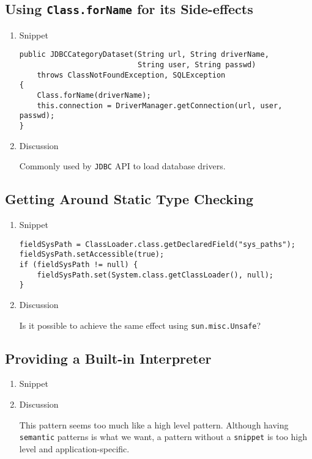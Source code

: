 \documentclass{usiinfdocprop}
\begin{document}
\subsection{Using \texttt{Class.forName} for its Side-effects}
\label{sec:orgf4a1f63}
\begin{enumerate}
\item Snippet
\label{sec:org295b080}

\lstset{language=java,label= ,caption= ,captionpos=b,numbers=none}
\begin{lstlisting}
public JDBCCategoryDataset(String url, String driverName,
                           String user, String passwd)
    throws ClassNotFoundException, SQLException
{
    Class.forName(driverName);
    this.connection = DriverManager.getConnection(url, user, passwd);
}
\end{lstlisting}

\item Discussion
\label{sec:orgcc814ae}

Commonly used by \texttt{JDBC} API to load database drivers.
\end{enumerate}

\subsection{Getting Around Static Type Checking}
\label{sec:orgf154835}
\begin{enumerate}
\item Snippet
\label{sec:org834a23c}

\lstset{language=java,label= ,caption= ,captionpos=b,numbers=none}
\begin{lstlisting}
fieldSysPath = ClassLoader.class.getDeclaredField("sys_paths");
fieldSysPath.setAccessible(true);
if (fieldSysPath != null) {
    fieldSysPath.set(System.class.getClassLoader(), null);
}
\end{lstlisting}

\item Discussion
\label{sec:orga0d1092}

Is it possible to achieve the same effect using \texttt{sun.misc.Unsafe}?
\end{enumerate}

\subsection{Providing a Built-in Interpreter}
\label{sec:org283c3e2}
\begin{enumerate}
\item Snippet
\label{sec:orgc26851c}
\item Discussion
\label{sec:org87a08f6}

This pattern seems too much like a high level pattern.
Although having \texttt{semantic} patterns is what we want, a pattern without a \texttt{snippet} is too high level and application-specific.
\end{enumerate}
\end{document}
